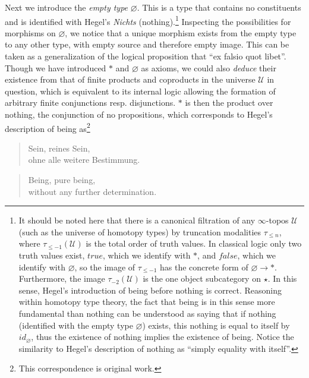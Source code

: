 \documentclass{article}
\begin{document}
Next we introduce the \emph{empty type} $\varnothing$. This is a type that contains no constituents and is 
identified with Hegel's \emph{Nichts} (nothing).\footnote{It should be noted here that there is a canonical 
filtration of any $\infty$-topos $\mathcal{U}$ (such as the universe of homotopy types) by truncation 
modalities $\tau_{\leq n}$, where $\tau_{\leq -1}(\mathcal{U})$ is the total order of truth values. In 
classical logic only two truth values exist, $true$, which we identify with $*$, and $false$, which we 
identify with $\varnothing$, so the image of $\tau_{\leq -1}$ has the concrete form of 
$\varnothing\rightarrow *$. Furthermore, the image $\tau_{-2}(\mathcal{U})$ is the one object subcategory on 
$\star$. In this sense, Hegel's introduction of being before nothing is correct. Reasoning within homotopy 
type theory, the fact that being is in this sense more fundamental than nothing can be understood as saying 
that if nothing (identified with the empty type $\varnothing$) exists, this nothing is equal to itself by 
$id_\varnothing$, thus the existence of nothing implies the existence of being. Notice the similarity to 
Hegel's description of nothing as ``simply equality with itself''.} Inspecting the possibilities for 
morphisms on $\varnothing$, we notice that a unique morphism exists from the empty type to any other type, 
with empty source and therefore empty image. This can be taken as a generalization of the logical proposition
that ``ex falsio quot libet''. \\

Though we have introduced $*$ and $\varnothing$ as axioms, we could also \emph{deduce} their existence from 
that of finite products and coproducts in the universe $\mathcal{U}$ in question, which is equivalent to its 
internal logic allowing the formation of arbitrary finite conjunctions resp. disjunctions. $*$ is then the 
product over nothing, the conjunction of no propositions, which corresponds to Hegel's description of being 
as\footnote{This correspondence is original work.} 


\begin{quote}
    Sein, reines Sein, \\
    ohne alle weitere Bestimmung.
\end{quote}

\begin{quote}
    Being, pure being, \\ 
    without any further determination.
\end{quote}
\end{document}
